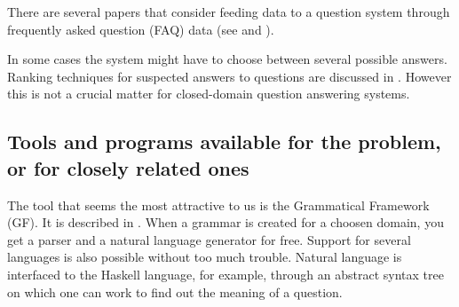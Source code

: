 \documentclass[a4paper,11pt]{article}
\begin{document}
There are several papers that consider feeding data to a question system through
frequently asked question (FAQ) data (see \cite{evaluatingqasusingfaq} and
\cite{faqfindersys}).

In some cases the system might have to choose between several possible answers.
Ranking techniques for suspected answers to questions are discussed in
\cite{rankingsuspected}. However this is not a crucial matter for closed-domain
question answering systems.

\subsection{Tools and programs available for the problem, or for closely related ones}
The tool that seems the most attractive to us is the Grammatical Framework (GF). It
is described in \cite{ranta-2011}. When a grammar is created for a choosen domain,
you get a parser and a natural language generator for free. Support for several
languages is also possible without too much trouble. Natural language is interfaced to the
Haskell language, for example, through an abstract syntax tree on which one can work
to find out the meaning of a question.




\end{document}

